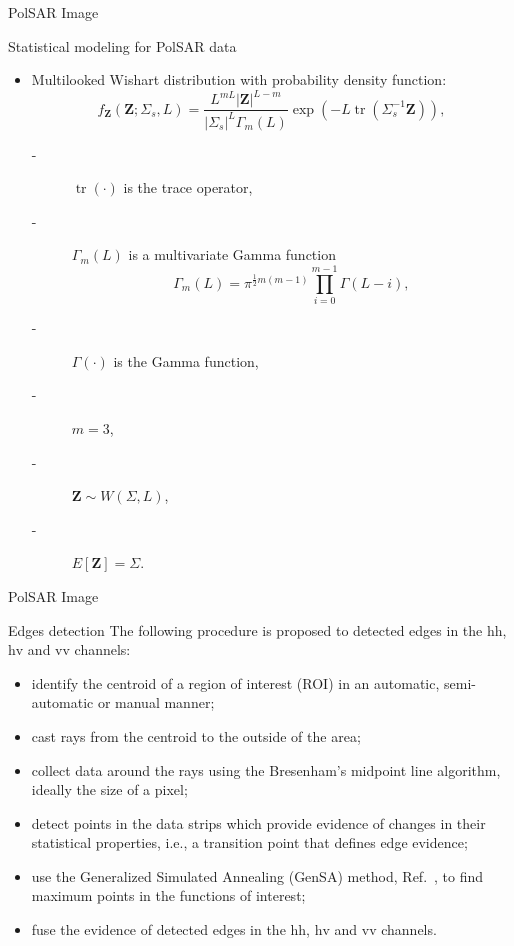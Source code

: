 \documentclass[10pt]{beamer}
\DeclareMathOperator{\traco}{tr} %
\begin{document}
\begin{frame}[fragile]{PolSAR Image}
\begin{alertblock}{Statistical modeling for PolSAR data}
\begin{itemize}
\item Multilooked Wishart distribution with probability density function:
\begin{equation}
    f_{\mathbf{Z}}(\mathbf{Z};\Sigma_{s},L)=\frac{L^{mL}|\mathbf{Z}|^{L-m}}{|\Sigma_{s}|^{L}\Gamma_m(L)} \exp(-L\traco(\Sigma_{s}^{-1}\mathbf{Z})),
    \label{eq_04}
\end{equation} 
\begin{description}
\item[-] $\traco(\cdot)$ is the trace operator,
\item[-] $\Gamma_m(L)$ is a multivariate Gamma function
\begin{equation*}
	\Gamma_m(L)=\pi^{\frac{1}{2}m(m-1)} \prod_{i=0}^{m-1}\Gamma(L-i),
\end{equation*}
\item[-]$\Gamma(\cdot)$ is the Gamma function,
\item[-]$m=3$,
\item[-]$\mathbf{Z}\sim W(\Sigma, L)$, 
\item[-]$E[\mathbf{Z}]=\Sigma$. 
\end{description} 
\end{itemize}
\end{alertblock}
\end{frame}

\begin{frame}[fragile]{PolSAR Image}
\begin{alertblock}{Edges detection}
The following procedure is proposed to detected edges in the $\text{hh}$, $\text{hv}$ and $\text{vv}$ channels:
\begin{itemize}
	\item identify the centroid of a region of interest (ROI) in an automatic, semi-automatic or manual manner;
	\item cast rays from the centroid to the outside of the area;
	\item collect data around the rays using the  Bresenham's midpoint line algorithm, ideally the size of a pixel;
	\item detect points in the data strips which provide evidence of changes in their statistical properties, i.e., a transition point that defines edge evidence;
	\item use the Generalized Simulated Annealing (GenSA) method, Ref.~\cite{xgsh}, to find maximum points in the functions of interest;
	\item fuse the evidence of detected edges in the $\text{hh}$, $\text{hv}$ and $\text{vv}$ channels.
\end{itemize}
\end{alertblock}
\end{frame}
\end{document}
